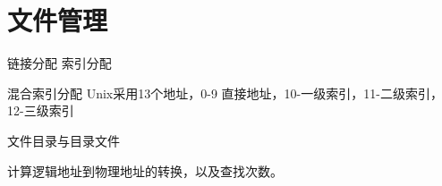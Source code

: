 \chapter*{文件管理}

链接分配
索引分配

混合索引分配
Unix采用13个地址，0-9 直接地址，10-一级索引，11-二级索引，12-三级索引 

文件目录与目录文件

计算逻辑地址到物理地址的转换，以及查找次数。

